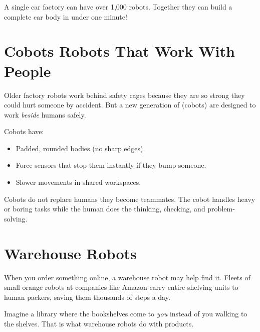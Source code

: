 \begin{funfact}
  A single car factory can have over 1,000 robots. Together they can
  build a complete car body in under one minute!
\end{funfact}

\sectionrule

\section*{Cobots \textemdash{} Robots That Work With People}

Older factory robots work behind safety cages because they are so
strong they could hurt someone by accident. But a new generation of
 (cobots) are designed to work \emph{beside}
humans safely.

Cobots have:
\begin{itemize}
  \item Padded, rounded bodies (no sharp edges).
  \item Force sensors that stop them instantly if they bump someone.
  \item Slower movements in shared workspaces.
\end{itemize}

\begin{bigidea}
  Cobots do not replace humans \textemdash{} they become teammates.
  The cobot handles heavy or boring tasks while the human does
  the thinking, checking, and problem-solving.
\end{bigidea}

\sectionrule

\section*{Warehouse Robots}

When you order something online, a warehouse robot may help find it.
Fleets of small orange robots at companies like Amazon carry entire
shelving units to human packers, saving them thousands of steps a day.

\begin{picturethis}
  Imagine a library where the bookshelves come to \emph{you} instead
  of you walking to the shelves. That is what warehouse robots do
  with products.
\end{picturethis}

\sectionrule


